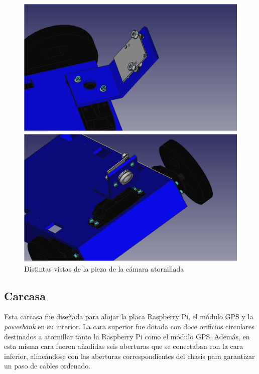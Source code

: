 \begin{figure}[ht!]
	\centering
	\begin{minipage}{0.45\linewidth}
		\centering
		\includegraphics[width=\linewidth]{figs/cap5/camera2con.png}
		\caption*{\centering}
	\end{minipage}
	\hspace{1cm}
	\begin{minipage}{0.45\linewidth}
		\centering
		\includegraphics[width=\linewidth]{figs/cap5/camera3con.png}
		\caption*{\centering}
	\end{minipage}
	\caption{Distintas vistas de la pieza de la cámara atornillada}
	\label{fig:pcamaramontada}
\end{figure}


\subsection{Carcasa}


Esta carcasa fue diseñada para alojar la placa Raspberry Pi, el módulo GPS y la \textit{powerbank} en su interior. La cara superior fue dotada con doce orificios circulares destinados a atornillar tanto la Raspberry Pi como el módulo GPS. Además, en esta misma cara fueron añadidas seis aberturas que se conectaban con la cara inferior, alineándose con las aberturas correspondientes del chasis para garantizar un paso de cables ordenado.


